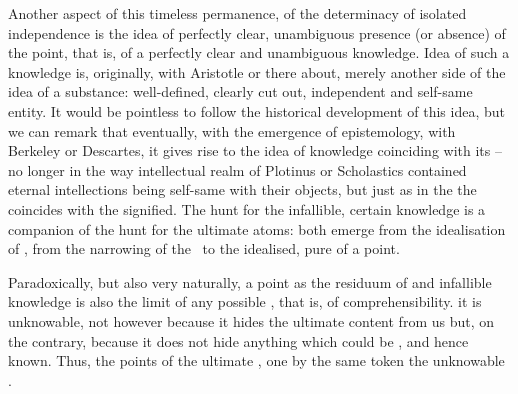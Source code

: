 Another aspect of this timeless permanence, of the
determinacy of isolated independence is the idea of perfectly clear, unambiguous
presence (or absence) of the point, that is, of a perfectly clear and unambiguous
knowledge. Idea of such a knowledge is, originally, with Aristotle or
there about, merely another side of the idea of a substance: well-defined,
clearly cut out, independent and self-same entity. It would be pointless to
follow the historical development of this idea, but we can remark that
eventually, with the emergence of epistemology, with Berkeley or Descartes, it
gives rise to the idea of knowledge coinciding with its  -- no longer
in the way intellectual realm of Plotinus or Scholastics contained eternal
intellections being self-same with their objects, but just as in the
 the  coincides with the signified.
The hunt for the infallible, certain knowledge is a companion of the hunt for
the ultimate atoms: both emerge from the idealisation of , from the narrowing of the \hoa\ to the idealised, pure
 of a point.


\pa\label{pa:pointUnknown}
Paradoxically, but also very naturally, a point  as the residuum of
 and infallible knowledge is also the limit of any possible
, that is, of comprehensibility.  it is
unknowable, not however because it hides the ultimate content from us but, on
the contrary, because it does not hide anything which could be
, and hence known. Thus,  the points of the
ultimate , one  by the same token the unknowable
. 

